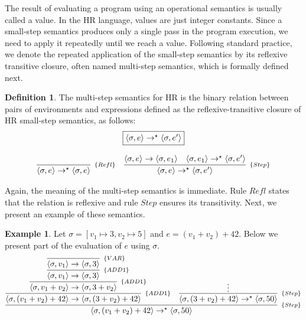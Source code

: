 \documentclass[oneside,12pt]{scrbook}
\theoremstyle{definition}
\newtheorem{Example}{Example}
\theoremstyle{plain}
\theoremstyle{definition}
\newtheorem{Definition}{Definition}
\begin{document}
The result of evaluating a program using an operational semantics is usually called a value. In the HR language,
values are just integer constants. Since a small-step semantics produces only a single pass in the
program execution, we need to apply it repeatedly until we reach a value. Following standard practice,
we denote the repeated application of the small-step semantics by its reflexive transitive closure, often
named multi-step semantics, which is formally defined next.

\begin{Definition}
   The multi-step semantics for HR is the binary relation between pairs of environments and
   expressions defined as the reflexive-transitive closure of HR small-step semantics, as follows:
   \[
       \begin{array}{c}
          \fbox{$\langle \sigma,e\rangle \to^\star \langle \sigma, e'\rangle$} \\ \\
          \begin{array}{cc}
             \infer[_{\{Refl\}}]
                   {\langle \sigma, e\rangle \to^\star \langle \sigma, e\rangle}{} &
             \infer[_{\{Step\}}]
                   {\langle \sigma, e \rangle \to^\star \langle \sigma, e' \rangle}
                   {\langle \sigma, e \rangle \to \langle \sigma, e_1 \rangle &
                    \langle \sigma, e_1 \rangle \to^\star \langle \sigma, e' \rangle}
          \end{array}
       \end{array}
   \]
\end{Definition}

Again, the meaning of the multi-step semantics is immediate. Rule $Refl$ states that the relation is reflexive and rule $Step$ ensures its transitivity. Next, we present an example of these semantics.

\begin{Example}
   Let $\sigma = [v_1\mapsto 3, v_2\mapsto 5]$ and $e = (v_1 + v_2) + 42$. Below we present part of the evaluation of
   $e$ using $\sigma$.
   \[
      \infer[_{\{Step\}}]
            {\langle \sigma, (v_1 + v_2) + 42 \rangle \to^\star \langle \sigma, 50 \rangle}
            {
               \infer[_{\{ADD1\}}]
                     {\langle \sigma, (v_1 + v_2) + 42 \rangle \to \langle \sigma, (3 + v_2) + 42 \rangle}
                     {
                        \infer[_{\{ADD1\}}]
                              {\langle \sigma, v_1 + v_2 \rangle \to \langle \sigma, 3 + v_2 \rangle}
                              {
                                 \infer[_{\{ADD1\}}]
                                       {\langle \sigma, v_1 \rangle \to \langle \sigma, 3 \rangle}
                                       {
                                         \infer[_{\{VAR\}}]
                                               {\langle \sigma, v_1 \rangle \to \langle \sigma, 3 \rangle}{}
                                       }
                              } 
                     }
               &
               \infer[_{\{Step\}}]
                     {\langle \sigma, (3 + v_2) + 42 \rangle \to^\star \langle \sigma, 50 \rangle}{\vdots}
            }
   \]
\end{Example}
\end{document}
